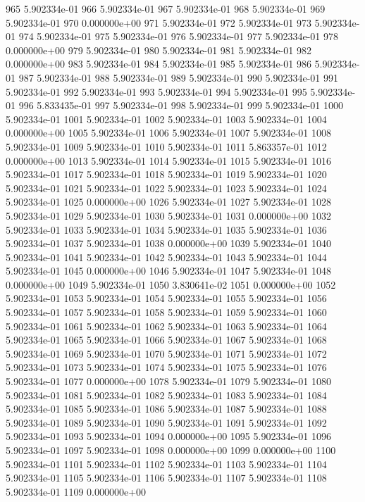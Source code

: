 \documentclass{article}
\begin{document}
\begin{Schunk}
\begin{Soutput}
965  5.902334e-01
966  5.902334e-01
967  5.902334e-01
968  5.902334e-01
969  5.902334e-01
970  0.000000e+00
971  5.902334e-01
972  5.902334e-01
973  5.902334e-01
974  5.902334e-01
975  5.902334e-01
976  5.902334e-01
977  5.902334e-01
978  0.000000e+00
979  5.902334e-01
980  5.902334e-01
981  5.902334e-01
982  0.000000e+00
983  5.902334e-01
984  5.902334e-01
985  5.902334e-01
986  5.902334e-01
987  5.902334e-01
988  5.902334e-01
989  5.902334e-01
990  5.902334e-01
991  5.902334e-01
992  5.902334e-01
993  5.902334e-01
994  5.902334e-01
995  5.902334e-01
996  5.833435e-01
997  5.902334e-01
998  5.902334e-01
999  5.902334e-01
1000 5.902334e-01
1001 5.902334e-01
1002 5.902334e-01
1003 5.902334e-01
1004 0.000000e+00
1005 5.902334e-01
1006 5.902334e-01
1007 5.902334e-01
1008 5.902334e-01
1009 5.902334e-01
1010 5.902334e-01
1011 5.863357e-01
1012 0.000000e+00
1013 5.902334e-01
1014 5.902334e-01
1015 5.902334e-01
1016 5.902334e-01
1017 5.902334e-01
1018 5.902334e-01
1019 5.902334e-01
1020 5.902334e-01
1021 5.902334e-01
1022 5.902334e-01
1023 5.902334e-01
1024 5.902334e-01
1025 0.000000e+00
1026 5.902334e-01
1027 5.902334e-01
1028 5.902334e-01
1029 5.902334e-01
1030 5.902334e-01
1031 0.000000e+00
1032 5.902334e-01
1033 5.902334e-01
1034 5.902334e-01
1035 5.902334e-01
1036 5.902334e-01
1037 5.902334e-01
1038 0.000000e+00
1039 5.902334e-01
1040 5.902334e-01
1041 5.902334e-01
1042 5.902334e-01
1043 5.902334e-01
1044 5.902334e-01
1045 0.000000e+00
1046 5.902334e-01
1047 5.902334e-01
1048 0.000000e+00
1049 5.902334e-01
1050 3.830641e-02
1051 0.000000e+00
1052 5.902334e-01
1053 5.902334e-01
1054 5.902334e-01
1055 5.902334e-01
1056 5.902334e-01
1057 5.902334e-01
1058 5.902334e-01
1059 5.902334e-01
1060 5.902334e-01
1061 5.902334e-01
1062 5.902334e-01
1063 5.902334e-01
1064 5.902334e-01
1065 5.902334e-01
1066 5.902334e-01
1067 5.902334e-01
1068 5.902334e-01
1069 5.902334e-01
1070 5.902334e-01
1071 5.902334e-01
1072 5.902334e-01
1073 5.902334e-01
1074 5.902334e-01
1075 5.902334e-01
1076 5.902334e-01
1077 0.000000e+00
1078 5.902334e-01
1079 5.902334e-01
1080 5.902334e-01
1081 5.902334e-01
1082 5.902334e-01
1083 5.902334e-01
1084 5.902334e-01
1085 5.902334e-01
1086 5.902334e-01
1087 5.902334e-01
1088 5.902334e-01
1089 5.902334e-01
1090 5.902334e-01
1091 5.902334e-01
1092 5.902334e-01
1093 5.902334e-01
1094 0.000000e+00
1095 5.902334e-01
1096 5.902334e-01
1097 5.902334e-01
1098 0.000000e+00
1099 0.000000e+00
1100 5.902334e-01
1101 5.902334e-01
1102 5.902334e-01
1103 5.902334e-01
1104 5.902334e-01
1105 5.902334e-01
1106 5.902334e-01
1107 5.902334e-01
1108 5.902334e-01
1109 0.000000e+00

\end{Soutput}
\end{Schunk}
\end{document}
